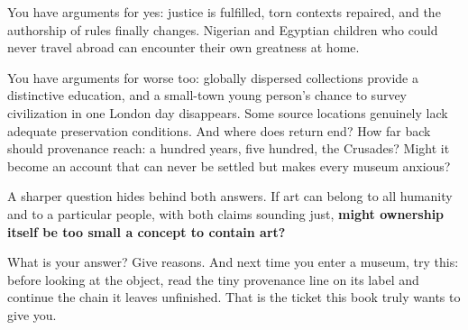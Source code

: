 You have arguments for yes: justice is fulfilled, torn contexts repaired, and the authorship of rules finally changes. Nigerian and Egyptian children who could never travel abroad can encounter their own greatness at home.

You have arguments for worse too: globally dispersed collections provide a distinctive education, and a small-town young person's chance to survey civilization in one London day disappears. Some source locations genuinely lack adequate preservation conditions. And where does return end? How far back should provenance reach: a hundred years, five hundred, the Crusades? Might it become an account that can never be settled but makes every museum anxious?

A sharper question hides behind both answers. If art can belong to all humanity and to a particular people, with both claims sounding just, \textbf{might ownership itself be too small a concept to contain art?}

What is your answer? Give reasons. And next time you enter a museum, try this: before looking at the object, read the tiny provenance line on its label and continue the chain it leaves unfinished. That is the ticket this book truly wants to give you.

